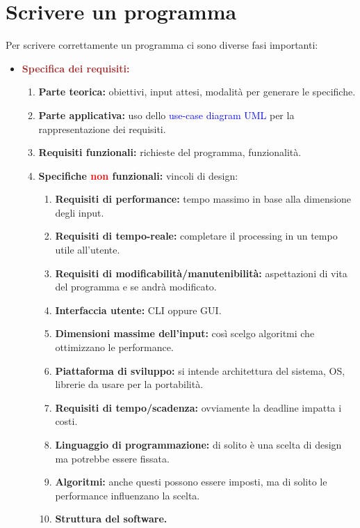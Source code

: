 \chapter{Scrivere un programma}
Per scrivere correttamente un programma ci sono diverse fasi importanti:
\begin{itemize}
    \item \textbf{\textcolor{brown}{Specifica dei requisiti:}}
    \begin{enumerate}
        \item \textbf{Parte teorica:} obiettivi, input attesi, modalità per generare le specifiche.
        \item \textbf{Parte applicativa:} uso dello \textcolor{blue}{use-case diagram UML} per la rappresentazione dei requisiti.
        \item \textbf{Requisiti funzionali:} richieste del programma, funzionalità.
        \item \textbf{Specifiche \textcolor{red}{non} funzionali:} vincoli di design:
        \begin{enumerate}
            \item \textbf{Requisiti di performance:} tempo massimo in base alla dimensione degli input.
            \item \textbf{Requisiti di tempo-reale:} completare il processing in un tempo utile all'utente.
            \item \textbf{Requisiti di modificabilità/manutenibilità:} aspettazioni di vita del programma e se andrà modificato.
            \item \textbf{Interfaccia utente:} CLI oppure GUI.
            \item \textbf{Dimensioni massime dell'input:} così scelgo algoritmi che ottimizzano le performance.
            \item \textbf{Piattaforma di sviluppo:} si intende architettura del sistema, OS, librerie da usare per la portabilità.
            \item \textbf{Requisiti di tempo/scadenza:} ovviamente la deadline impatta i costi.
            \item \textbf{Linguaggio di programmazione:} di solito è una scelta di design ma potrebbe essere fissata.
            \item \textbf{Algoritmi:} anche questi possono essere imposti, ma di solito le performance influenzano la scelta.
            \item \textbf{Struttura del software.}
        \end{enumerate}

\end{enumerate}
\end{itemize}
